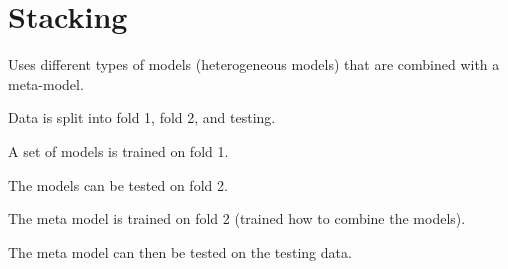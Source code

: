 	\section{Stacking}
Uses different types of models (heterogeneous models) that are combined with a meta-model.

	\begin{numberedlist}
		\item Data is split into fold 1, fold 2, and testing.
		\item A set of models is trained on fold 1.
		\item The models can be tested on fold 2.
		\item The meta model is trained on fold 2 (trained how to combine the models).
		\item The meta model can then be tested on the testing data.
	\end{numberedlist}